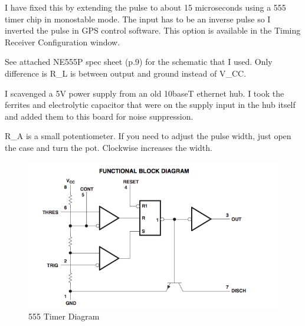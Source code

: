 I have fixed this by extending the pulse to about 15 microseconds using a 555 timer chip in monostable mode. The input has to be an inverse pulse so I inverted the pulse in GPS control software. This option is available in the Timing Receiver Configuration window.

See attached NE555P spec sheet (p.9) for the schematic that I used. Only difference is R\_L is between output and ground instead of V\_CC.

I scavenged a 5V power supply from an old 10baseT ethernet hub. I took the ferrites and electrolytic capacitor that were on the supply input in the hub itself and added them to this board for noise suppression.

R\_A is a small potentiometer. If you need to adjust the pulse width, just open the case and turn the pot. Clockwise increases the width.

\begin{figure}[htbp]
	\centering
		\includegraphics[width=15cm]{./figures/timer555.png}
	\caption{{555 Timer Diagram}}
	\label{fig:timer_diag}
\end{figure}


